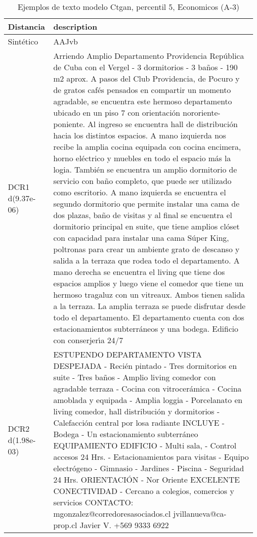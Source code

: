 \begin{table}[H]
\centering
\fontsize{10}{14}\selectfont
\caption{Ejemplos de texto modelo Ctgan, percentil 5, Economicos (A-3)}
\label{table-example-economicos-a-3-ctgan-5p-text}
\begin{tabular}{|l|m{35em}|}
\hline
\rowcolor[gray]{0.8}
Distancia & description \\
\hline Sintético & AAJvb \\
\hline DCR1 d(9.37e-06) & Arriendo Amplio Departamento Providencia   Rep\'ublica de Cuba con el Vergel - 3 dormitorios - 3 ba\~nos - 190 m2 aprox.  A pasos del Club Providencia, de Pocuro y de gratos caf\'es pensados en compartir un momento agradable, se encuentra este hermoso departamento ubicado en un piso 7 con orientaci\'on nororiente-poniente. Al ingreso se encuentra hall de distribuci\'on hacia los distintos espacios. A mano izquierda nos recibe la amplia cocina equipada con cocina encimera, horno el\'ectrico y muebles en todo el espacio m\'as la logia. Tambi\'en se encuentra un amplio dormitorio de servicio con ba\~no completo, que puede ser utilizado como escritorio. A mano izquierda se encuentra el segundo dormitorio que permite instalar una cama de dos plazas, ba\~no de visitas y al final se encuentra el dormitorio principal en suite, que tiene amplios cl\'oset con capacidad para instalar una cama S\'uper King, poltronas para crear un ambiente grato de descanso y salida a la terraza que rodea todo el departamento. A mano derecha se encuentra el living que tiene dos espacios amplios y luego viene el comedor que tiene un hermoso tragaluz con un vitreaux. Ambos tienen salida a la terraza. La amplia terraza se puede disfrutar desde todo el departamento. El departamento cuenta con dos estacionamientos subterr\'aneos y una bodega. Edificio con conserjer{\'\i}a 24/7 \\
\hline DCR2 d(1.98e-03) & ESTUPENDO DEPARTAMENTO VISTA DESPEJADA  - Reci\'en pintado - Tres dormitorios en suite - Tres ba\~nos - Amplio living comedor con agradable terraza - Cocina con vitrocer\'amica - Cocina amoblada y equipada - Amplia loggia  - Porcelanato en living comedor, hall distribuci\'on y dormitorios - Calefacci\'on central por losa radiante  INCLUYE - Bodega - Un estacionamiento subterr\'aneo  EQUIPAMIENTO EDIFICIO - Multi sala, - Control accesos 24 Hrs. - Estacionamientos para visitas - Equipo electr\'ogeno - Gimnasio - Jardines  - Piscina  - Seguridad 24 Hrs.  ORIENTACI\'ON - Nor Oriente  EXCELENTE CONECTIVIDAD - Cercano a colegios, comercios y servicios  CONTACTO: mgonzalez@corredoresasociados.cl jvillanueva@ca-prop.cl Javier V. +569 9333 6922 \\
\hline
\end{tabular}
\end{table}
